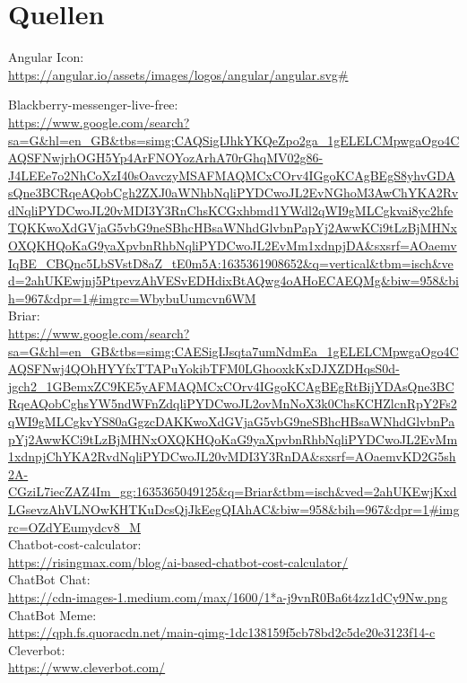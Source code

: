 \section{Quellen}
\raggedright Angular Icon:\\
\url{https://angular.io/assets/images/logos/angular/angular.svg#}\\

\raggedright Blackberry-messenger-live-free:\\
\url{https://www.google.com/search?sa=G&hl=en_GB&tbs=simg:CAQSigIJhkYKQeZpo2ga_1gELELCMpwgaOgo4CAQSFNwjrhOGH5Yp4ArFNOYozArhA70rGhqMV02g86-J4LEEe7o2NhCoXzI40sOavczyMSAFMAQMCxCOrv4IGgoKCAgBEgS8yhvGDAsQne3BCRqeAQobCgh2ZXJ0aWNhbNqliPYDCwoJL2EvNGhoM3AwChYKA2RvdNqliPYDCwoJL20vMDI3Y3RnChsKCGxhbmd1YWdl2qWI9gMLCgkvai8yc2hfeTQKKwoXdGVjaG5vbG9neSBhcHBsaWNhdGlvbnPapYj2AwwKCi9tLzBjMHNxOXQKHQoKaG9yaXpvbnRhbNqliPYDCwoJL2EvMm1xdnpjDA&sxsrf=AOaemvIqBE_CBQnc5LbSVstD8aZ_tE0m5A:1635361908652&q=vertical&tbm=isch&ved=2ahUKEwjnj5PtpevzAhVESvEDHdixBtAQwg4oAHoECAEQMg&biw=958&bih=967&dpr=1#imgrc=WbybuUumcvn6WM}\\

Briar:\\
\url{https://www.google.com/search?sa=G&hl=en_GB&tbs=simg:CAESigIJsqta7umNdmEa_1gELELCMpwgaOgo4CAQSFNwj4QOhHYYfxTTAPuYokibTFM0LGhooxkKxDJXZDHqsS0d-jgch2_1GBemxZC9KE5yAFMAQMCxCOrv4IGgoKCAgBEgRtBijYDAsQne3BCRqeAQobCghsYW5ndWFnZdqliPYDCwoJL2ovMnNoX3k0ChsKCHZlcnRpY2Fs2qWI9gMLCgkvYS80aGgzcDAKKwoXdGVjaG5vbG9neSBhcHBsaWNhdGlvbnPapYj2AwwKCi9tLzBjMHNxOXQKHQoKaG9yaXpvbnRhbNqliPYDCwoJL2EvMm1xdnpjChYKA2RvdNqliPYDCwoJL20vMDI3Y3RnDA&sxsrf=AOaemvKD2G5sh2A-CGziL7iecZAZ4Im_gg:1635365049125&q=Briar&tbm=isch&ved=2ahUKEwjKxdLGsevzAhVLNOwKHTKuDcsQjJkEegQIAhAC&biw=958&bih=967&dpr=1#imgrc=OZdYEumydcv8_M}\\

Chatbot-cost-calculator:\\
\url{https://risingmax.com/blog/ai-based-chatbot-cost-calculator/}\\

ChatBot Chat:\\
\url{https://cdn-images-1.medium.com/max/1600/1*a-j9vnR0Ba6t4zz1dCy9Nw.png}\\

ChatBot Meme:\\
\url{https://qph.fs.quoracdn.net/main-qimg-1dc138159f5cb78bd2c5de20e3123f14-c}\\

Cleverbot:\\
\url{https://www.cleverbot.com/}\\

